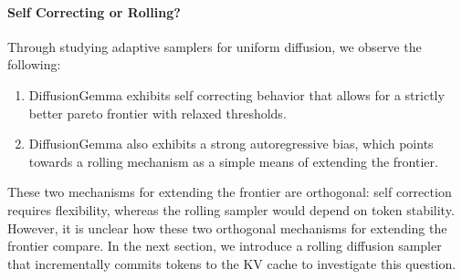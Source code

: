 \paragraph{Self Correcting or Rolling?}
Through studying adaptive samplers for uniform diffusion, we observe the following:
\begin{enumerate}
    \item DiffusionGemma exhibits self correcting behavior that allows for a strictly better pareto frontier with relaxed thresholds. 
    \item DiffusionGemma also exhibits a strong autoregressive bias, which points towards a rolling mechanism as a simple means of extending the frontier.
\end{enumerate}

These two mechanisms for extending the frontier are orthogonal: self correction requires flexibility, whereas the rolling sampler would depend on token stability. 
However, it is unclear how these two orthogonal mechanisms for extending the frontier compare.
In the next section, we introduce a rolling diffusion sampler that incrementally commits tokens to the KV cache to investigate this question.
